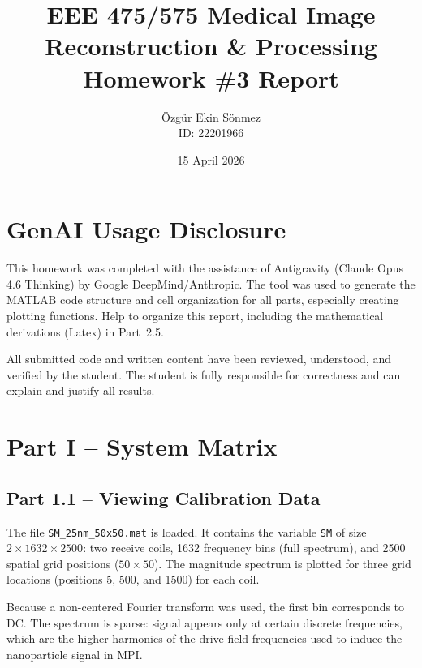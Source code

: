 \documentclass[12pt,a4paper]{article}
\title{
    \textbf{EEE 475/575 Medical Image Reconstruction \& Processing}\\[0.4em]
    \Large Homework \#3 Report
}
\author{
    Özgür Ekin Sönmez \\
    ID: 22201966
}
\date{15 April 2026}
\begin{document}
\maketitle

\section*{GenAI Usage Disclosure}

This homework was completed with the assistance of Antigravity (Claude Opus 4.6 Thinking) by Google DeepMind/Anthropic. The tool was used to generate the MATLAB code structure and cell organization for all parts, especially creating plotting functions. 
Help to organize this report, including the mathematical derivations (Latex) in Part~2.5.

All submitted code and written content have been reviewed, understood, and verified by the student. The student is fully responsible for correctness and can explain and justify all results.

\newpage

\section{Part I -- System Matrix}

\subsection{Part 1.1 -- Viewing Calibration Data}

The file \texttt{SM\_25nm\_50x50.mat} is loaded. It contains the variable \texttt{SM} of size $2\times 1632\times 2500$: two receive coils, 1632 frequency bins (full spectrum), and 2500 spatial grid positions ($50\times50$). The magnitude spectrum is plotted for three grid locations (positions 5, 500, and 1500) for each coil.

Because a non-centered Fourier transform was used, the first bin corresponds to DC. The spectrum is sparse: signal appears only at certain discrete frequencies, which are the higher harmonics of the drive field frequencies used to induce the nanoparticle signal in MPI.
\end{document}
